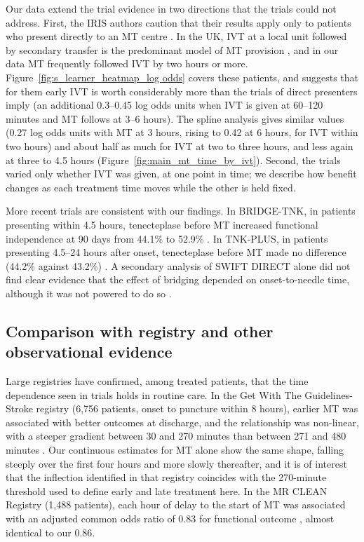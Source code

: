 Our data extend the trial evidence in two directions that the trials could not address. First, the IRIS authors caution that their results apply only to patients who present directly to an MT centre . In the UK, IVT at a local unit followed by secondary transfer is the predominant model of MT provision , and in our data MT frequently followed IVT by two hours or more. Figure~\ref{fig:s_learner_heatmap_log odds} covers these patients, and suggests that for them early IVT is worth considerably more than the trials of direct presenters imply (an additional 0.3--0.45 log odds units when IVT is given at 60--120 minutes and MT follows at 3--6 hours). The spline analysis gives similar values (0.27 log odds units with MT at 3 hours, rising to 0.42 at 6 hours, for IVT within two hours) and about half as much for IVT at two to three hours, and less again at three to 4.5 hours (Figure~\ref{fig:main_mt_time_by_ivt}). Second, the trials varied only whether IVT was given, at one point in time; we describe how benefit changes as each treatment time moves while the other is held fixed.

More recent trials are consistent with our findings. In BRIDGE-TNK, in patients presenting within 4.5 hours, tenecteplase before MT increased functional independence at 90 days from 44.1\% to 52.9\% . In TNK-PLUS, in patients presenting 4.5--24 hours after onset, tenecteplase before MT made no difference (44.2\% against 43.2\%) . A secondary analysis of SWIFT DIRECT alone did not find clear evidence that the effect of bridging depended on onset-to-needle time, although it was not powered to do so .

\subsection{Comparison with registry and other observational evidence}

Large registries have confirmed, among treated patients, that the time dependence seen in trials holds in routine care. In the Get With The Guidelines-Stroke registry (6,756 patients, onset to puncture within 8 hours), earlier MT was associated with better outcomes at discharge, and the relationship was non-linear, with a steeper gradient between 30 and 270 minutes than between 271 and 480 minutes . Our continuous estimates for MT alone show the same shape, falling steeply over the first four hours and more slowly thereafter, and it is of interest that the inflection identified in that registry coincides with the 270-minute threshold used to define early and late treatment here. In the MR CLEAN Registry (1,488 patients), each hour of delay to the start of MT was associated with an adjusted common odds ratio of 0.83 for functional outcome , almost identical to our 0.86.

